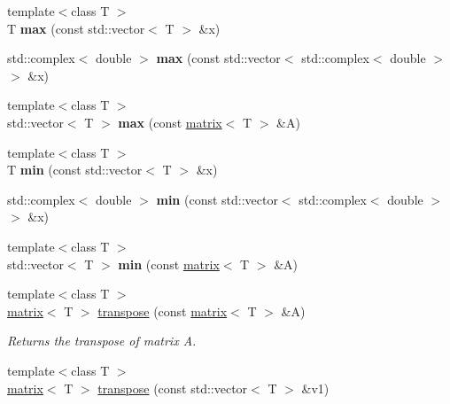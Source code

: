 \begin{DoxyCompactItemize}
\item 
\hypertarget{namespacekeycpp_a646c5e616337a8174bd39ce729e53612}{{\footnotesize template$<$class T $>$ }\\T {\bfseries max} (const std\-::vector$<$ T $>$ \&x)}\label{namespacekeycpp_a646c5e616337a8174bd39ce729e53612}

\item 
\hypertarget{namespacekeycpp_a35292f7ead7b19a2fc098f50f0147ce6}{std\-::complex$<$ double $>$ {\bfseries max} (const std\-::vector$<$ std\-::complex$<$ double $>$ $>$ \&x)}\label{namespacekeycpp_a35292f7ead7b19a2fc098f50f0147ce6}

\item 
\hypertarget{namespacekeycpp_af7ff5485352bd4412d18050843809d42}{{\footnotesize template$<$class T $>$ }\\std\-::vector$<$ T $>$ {\bfseries max} (const \hyperlink{classkeycpp_1_1matrix}{matrix}$<$ T $>$ \&A)}\label{namespacekeycpp_af7ff5485352bd4412d18050843809d42}

\item 
\hypertarget{namespacekeycpp_a28171fa81d0f537dd058e63164410b43}{{\footnotesize template$<$class T $>$ }\\T {\bfseries min} (const std\-::vector$<$ T $>$ \&x)}\label{namespacekeycpp_a28171fa81d0f537dd058e63164410b43}

\item 
\hypertarget{namespacekeycpp_aa0241416e190842fd0c352a6c94c57c3}{std\-::complex$<$ double $>$ {\bfseries min} (const std\-::vector$<$ std\-::complex$<$ double $>$ $>$ \&x)}\label{namespacekeycpp_aa0241416e190842fd0c352a6c94c57c3}

\item 
\hypertarget{namespacekeycpp_a33adfcd8368c2f96891ca3e27fd8affe}{{\footnotesize template$<$class T $>$ }\\std\-::vector$<$ T $>$ {\bfseries min} (const \hyperlink{classkeycpp_1_1matrix}{matrix}$<$ T $>$ \&A)}\label{namespacekeycpp_a33adfcd8368c2f96891ca3e27fd8affe}

\item 
\hypertarget{namespacekeycpp_a7fd5ce0385e9cc7bed5b44ed8475e8aa}{{\footnotesize template$<$class T $>$ }\\\hyperlink{classkeycpp_1_1matrix}{matrix}$<$ T $>$ \hyperlink{namespacekeycpp_a7fd5ce0385e9cc7bed5b44ed8475e8aa}{transpose} (const \hyperlink{classkeycpp_1_1matrix}{matrix}$<$ T $>$ \&A)}\label{namespacekeycpp_a7fd5ce0385e9cc7bed5b44ed8475e8aa}

\begin{DoxyCompactList}\small\item\em Returns the transpose of matrix A. \end{DoxyCompactList}\item 
\hypertarget{namespacekeycpp_a0a72326529750cf63cf05afa6fa15a65}{{\footnotesize template$<$class T $>$ }\\\hyperlink{classkeycpp_1_1matrix}{matrix}$<$ T $>$ \hyperlink{namespacekeycpp_a0a72326529750cf63cf05afa6fa15a65}{transpose} (const std\-::vector$<$ T $>$ \&v1)}\label{namespacekeycpp_a0a72326529750cf63cf05afa6fa15a65}


\end{DoxyCompactItemize}
